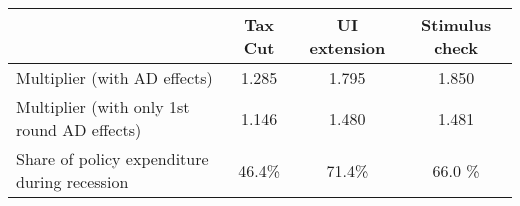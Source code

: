 \begin{tabular}{@{}lccc@{}} 
\toprule 
& Tax Cut    & UI extension    & Stimulus check    \\  \midrule 
Multiplier (with AD effects) &1.285  & 1.795  & 1.850     \\ 
Multiplier (with only 1st round AD effects) &1.146  & 1.480  & 1.481     \\ 
Share of policy expenditure during recession &46.4\%  & 71.4\%  & 66.0 \%    \\ 
\end{tabular}  
